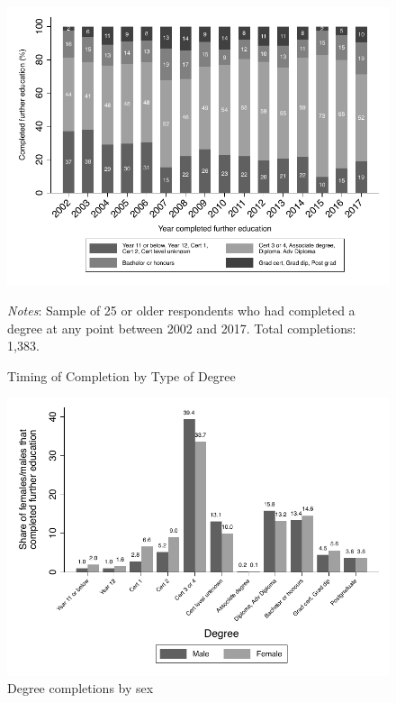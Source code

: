 \documentclass[12pt, a4paper]{article}
\begin{document}
\begin{figure}[htbp]
\centering
\caption{Timing of Completion by Type of Degree}
\vspace{0.5cm}
  \label{fig:yearcompdeg}
    \includegraphics{_figures/year_completed_bydegree.pdf}
\parbox{1\textwidth}{\footnotesize{\textit{Notes}: Sample of 25 or older respondents who had completed a degree at any point between 2002 and 2017. Total completions: 1,383.}}
\end{figure}


\begin{figure}[htbp]
\centering
\caption{Degree completions by sex}
\vspace{0.5cm}
  \label{fig:degbysex}
    \includegraphics{_figures/completions_by_gender_deg.pdf}
\end{figure}
\end{document}
